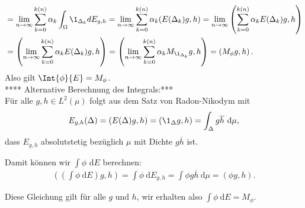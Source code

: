 \begin{solution}
\begin{align*}
  &= \lim_{n \to \infty}\sum_{k=0}^{k(n)}\alpha_k\int_{\Omega}\1_{\Delta_k} dE_{g,h}
  = \lim_{n \to \infty}\sum_{k=0}^{k(n)}\alpha_k(E(\Delta_k)g,h)
  = \lim_{n \to \infty}\left(\sum_{k=0}^{k(n)}\alpha_kE(\Delta_k)g,h\right) \\
  &= \left(\lim_{n \to \infty}\sum_{k=0}^{k(n)}\alpha_kE(\Delta_k)g,h\right)
  = \left(\lim_{n \to \infty}\sum_{k=0}^{k(n)}\alpha_kM_{\1_{\Delta_k}}g,h\right)
  = \left(M_{\phi}g,h\right).
\end{align*}
Also gilt $\Int{\phi}{E} = M_{\phi}$. \\
**** Alternative Berechnung des Integrals:*** \\
Für alle $g, h \in L^2(\mu)$ folgt aus dem Satz von Radon-Nikodym mit
\begin{align*}
    E_{g, h}(\Delta) = (E(\Delta) g, h) = (\1_\Delta g, h) = \int_{\Delta} g \overline h~\mathrm{d} \mu,
\end{align*}
dass $E_{g, h}$ absolutstetig bezüglich $\mu$ mit Dichte $g\overline h$ ist.

Damit können wir $\int \phi$ d$E$ berechnen:
\begin{align*}
    \left(\left(\int \phi ~\mathrm{d}E\right)g, h\right) =
    \int \phi ~\mathrm{d}E_{g,h} = \int \phi g \overline h~\mathrm{d} \mu = (\phi g, h).
\end{align*}

Diese Gleichung gilt für alle $g$ und $h$, wir erhalten also $\int \phi ~\mathrm{d}E = M_\phi$.
\end{solution}
